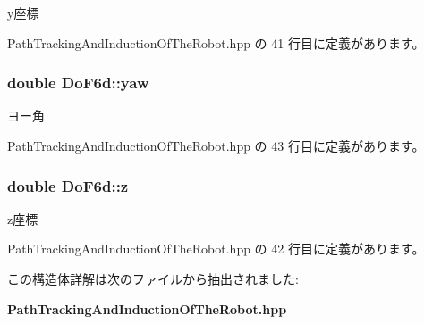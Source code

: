 y座標 



 Path\-Tracking\-And\-Induction\-Of\-The\-Robot.\-hpp の 41 行目に定義があります。

\subsubsection[{yaw}]{\setlength{\rightskip}{0pt plus 5cm}double Do\-F6d\-::yaw}\label{struct_do_f6d_ad35964121e90c1023f4b838158fb7922}


ヨー角 



 Path\-Tracking\-And\-Induction\-Of\-The\-Robot.\-hpp の 43 行目に定義があります。

\subsubsection[{z}]{\setlength{\rightskip}{0pt plus 5cm}double Do\-F6d\-::z}\label{struct_do_f6d_a9ac1f5cd6343928516c34c05241ec9fb}


z座標 



 Path\-Tracking\-And\-Induction\-Of\-The\-Robot.\-hpp の 42 行目に定義があります。



この構造体詳解は次のファイルから抽出されました\-:\begin{DoxyCompactItemize}
\item 
{\bf Path\-Tracking\-And\-Induction\-Of\-The\-Robot.\-hpp}\end{DoxyCompactItemize}
